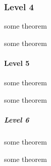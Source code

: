 \subsubsection{Level 4}\label{level-4}

\begin{Theorem}
some theorem
\end{Theorem}

\begin{Theorem}
some theorem
\end{Theorem}

\paragraph{Level 5}\label{level-5}

\begin{Theorem}
some theorem
\end{Theorem}

\begin{Theorem}
some theorem
\end{Theorem}

\subparagraph{Level 6}\label{level-6}

\begin{Theorem}
some theorem
\end{Theorem}

\begin{Theorem}
some theorem
\end{Theorem}
